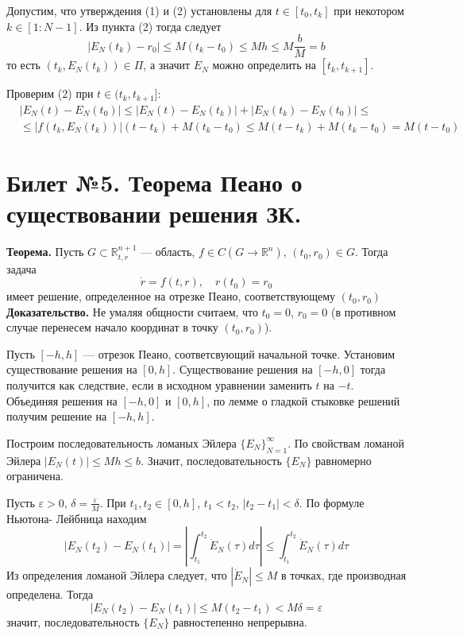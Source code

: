 \documentclass{article}
\begin{document}
Допустим, что утверждения (1) и (2) установлены для $t \in [t_0, t_k]$ при некотором $k \in [1 : N - 1]$. Из пункта (2) тогда следует
\begin{equation*}
    |E_N(t_k) - r_0| \le M(t_k - t_0) \le Mh \le M \frac{b}{M} = b
\end{equation*}
то есть $(t_k, E_N(t_k)) \in \Pi$, а значит $E_N$ можно определить на $[t_k, t_{k+1}]$.

Проверим (2) при $t \in (t_k, t_{k+1}]$:
\begin{equation*}
    \begin{aligned}
        &|E_N(t) - E_N(t_0)| \le |E_N(t) - E_N(t_k)| + |E_N(t_k) - E_N(t_0)| \le\\
        &\le |f(t_k, E_N(t_k))|(t-t_k) + M(t_k - t_0) \le M(t - t_k) + M(t_k - t_0) = M(t - t_0)
    \end{aligned}
\end{equation*}

\section{Билет №5. Теорема Пеано о существовании решения ЗК.}
\textbf{Теорема.} Пусть $G \subset \mathbb{R}_{t,r}^{n + 1}$ --- область, $f \in C(G \to \mathbb{R}^n)$, $(t_0, r_0) \in G$. Тогда задача
\begin{equation*}
    \dot{r} = f(t,r), \quad r(t_0) = r_0
\end{equation*}
имеет решение, определенное на отрезке Пеано, соответствующему $(t_0, r_0)$\\
\textbf{Доказательство.} Не умаляя общности считаем, что $t_0 = 0$, $r_0 = 0$ (в противном случае перенесем начало координат в точку $(t_0, r_0)$).

Пусть $[-h, h]$ --- отрезок Пеано, соответсвующий начальной точке. Установим существование решения на $[0, h]$. Существование решения на $[-h, 0]$ тогда получится как следствие, если в исходном уравнении заменить $t$ на $-t$. Объединяя решения на $[-h, 0]$ и $[0, h]$, по лемме о гладкой стыковке решений получим решение на $[-h, h]$.

Построим последовательность ломаных Эйлера $\{E_N\}_{N=1}^{\infty}$. По свойствам ломаной Эйлера $|E_N(t)| \le Mh \le b$. Значит, последовательность $\{E_N\}$ равномерно ограничена.

Пусть $\varepsilon > 0$, $\delta = \frac{\varepsilon}{M}$. При $t_1, t_2 \in [0, h]$, $t_1 < t_2$, $|t_2 - t_1| < \delta$. По формуле Ньютона- Лейбница находим
\begin{equation*}
    |E_N(t_2) - E_N(t_1)| = \left|\int_{t_1}^{t_2} \dot{E}_N(\tau)d\tau\right| \le \int_{t_1}^{t_2} \dot{E}_N(\tau)d\tau
\end{equation*}
Из определения ломаной Эйлера следует, что $|\dot{E}_N| \le M$ в точках, где производная определена. Тогда
\begin{equation*}
    |E_N(t_2) - E_N(t_1)| \le M(t_2 - t_1) < M\delta = \varepsilon
\end{equation*}
значит, последовательность $\{E_N\}$ равностепенно непрерывна.
\end{document}

